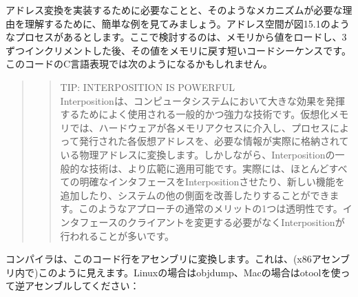 アドレス変換を実装するために必要なことと、そのようなメカニズムが必要な理由を理解するために、簡単な例を見てみましょう。アドレス空間が図15.1のようなプロセスがあるとします。ここで検討するのは、メモリから値をロードし、3ずつインクリメントした後、その値をメモリに戻す短いコードシーケンスです。このコードのC言語表現では次のようになるかもしれません。

\begin{Shaded}
\begin{Highlighting}[]
\NormalTok{; }
\NormalTok{; }
\end{Highlighting}
\end{Shaded}

\begin{quote}
\begin{quote}
TIP: INTERPOSITION IS POWERFUL\\
Interpositionは、コンピュータシステムにおいて大きな効果を発揮するためによく使用される一般的かつ強力な技術です。仮想化メモリでは、ハードウェアが各メモリアクセスに介入し、プロセスによって発行された各仮想アドレスを、必要な情報が実際に格納されている物理アドレスに変換します。しかしながら、Interpositionの一般的な技術は、より広範に適用可能です。実際には、ほとんどすべての明確なインタフェースをInterpositionさせたり、新しい機能を追加したり、システムの他の側面を改善したりすることができます。このようなアプローチの通常のメリットの1つは透明性です。インタフェースのクライアントを変更する必要がなくInterpositionが行われることが多いです。
\end{quote}
\end{quote}

コンパイラは、このコード行をアセンブリに変換します。これは、(x86アセンブリ内で)このように見えます。Linuxの場合はobjdump、Macの場合はotoolを使って逆アセンブルしてください：

\begin{Shaded}
\begin{Highlighting}[]
\end{Highlighting}
\end{Shaded}

